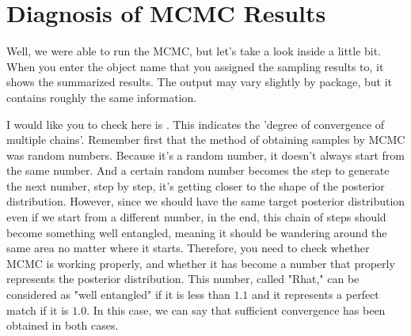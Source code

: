 \documentclass{ltjsbook}
\begin{document}
\section{Diagnosis of MCMC Results}
Well, we were able to run the MCMC, but let's take a look inside a little bit. When you enter the object name that you assigned the sampling results to, it shows the summarized results. The output may vary slightly by package, but it contains roughly the same information.






I would like you to check here is . This indicates the 'degree of convergence of multiple chains'.
Remember first that the method of obtaining samples by MCMC was random numbers. Because it's a random number, it doesn't always start from the same number.
And a certain random number becomes the step to generate the next number, step by step, it's getting closer to the shape of the posterior distribution. However, since we should have the same target posterior distribution even if we start from a different number, in the end, this chain of steps should become something well entangled, meaning it should be wandering around the same area no matter where it starts. Therefore, you need to check whether MCMC is working properly, and whether it has become a number that properly represents the posterior distribution. This number, called "Rhat," can be considered as "well entangled" if it is less than $1.1$ and it represents a perfect match if it is $1.0$. In this case, we can say that sufficient convergence has been obtained in both cases.
\end{document}
